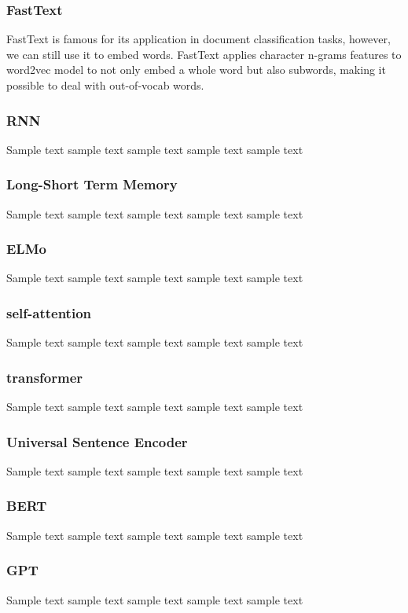 \subsubsection{FastText}
FastText is famous for its application in document classification tasks, however, we can still use it to embed words.
FastText applies character n-grams features to word2vec model to not only embed a whole word but also subwords, making it possible to deal with out-of-vocab words.


\subsubsection{RNN}
Sample text sample text sample text sample text sample text

\subsubsection{Long-Short Term Memory}
Sample text sample text sample text sample text sample text

\subsubsection{ELMo}
Sample text sample text sample text sample text sample text

\subsubsection{self-attention}
Sample text sample text sample text sample text sample text

\subsubsection{transformer}
Sample text sample text sample text sample text sample text

\subsubsection{Universal Sentence Encoder}
Sample text sample text sample text sample text sample text

\subsubsection{BERT}
Sample text sample text sample text sample text sample text

\subsubsection{GPT}
Sample text sample text sample text sample text sample text


